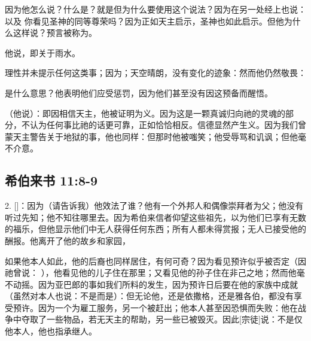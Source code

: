 因为他怎么说？什么是？就是但为什么要使用这个说法？因为在另一处经上也说：以及   你看见圣神的同等尊荣吗？因为正如天主启示，圣神也如此启示。但他为什么这样说？预言被称为。\par

他说，即关于雨水。\par

理性并未提示任何这类事；因为；天空晴朗，没有变化的迹象：然而他仍然敬畏：\par

是什么意思？他表明他们应受惩罚，因为他们甚至没有因这预备而醒悟。\par

（他说）：即因相信天主，他被证明为义。因为这是一颗真诚归向祂的灵魂的部分，不认为任何事比祂的话更可靠，正如恰恰相反。信德显然产生义。因为我们曾蒙天主警告关于地狱的事，他也同样：但那时他被嗤笑；他受辱骂和讥讽；但他毫不介意。\par


\subsection{希伯来书 11:8-9}

2. []：因为（请告诉我）他效法了谁？他有一个外邦人和偶像崇拜者为父；他没有听过先知；他不知往哪里去。因为希伯来信者仰望这些祖先，以为他们已享有无数的福乐，但他显示他们中无人获得任何东西；所有人都未得赏报；无人已接受他的酬报。他离开了他的故乡和家园，\par

如果他本人如此，他的后裔也同样居住，有何可奇？因为看见预许似乎被否定（因祂曾说： ），他看见他的儿子住在那里；又看见他的孙子住在非己之地；然而他毫不动摇。因为亚巴郎的事如我们所料的发生，因为预许日后要在他的家族中成就（虽然对本人也说：不是而是）：但无论他，还是依撒格，还是雅各伯，都没有享受预许。因为一个为雇工服务，另一个被赶出；他本人甚至因恐惧而失败：他在战争中夺取了一些物品，若无天主的帮助，另一些已被毁灭。因此[宗徒]说：不是仅他本人，他也指承继人。\par

